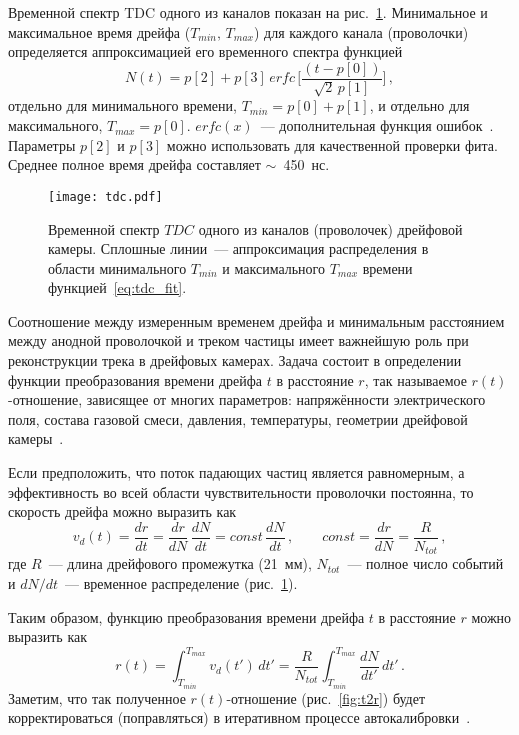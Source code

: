 Временной спектр TDC одного из каналов показан на рис.~\ref{fig:tdc}.
Минимальное и максимальное время дрейфа ($T_{min},\,T_{max}$) для каждого канала
(проволочки) определяется аппроксимацией его временного спектра функцией
\begin{equation}
  \label{eq:tdc_fit}
  N(t) = p[2] + p[3]\,erfc\,\Biggl[\frac{(t - p[0])}{\sqrt{2}\,p[1]} \Biggr]\,,
\end{equation}
отдельно для минимального времени, $T_{min} = p[0] + p[1]$, и отдельно для
максимального, $T_{max} = p[0]$. $erfc(x)$~--- дополнительная функция
ошибок~\cite{erfc_web}. Параметры $p[2]$ и $p[3]$ можно использовать для
качественной проверки фита. Среднее полное время дрейфа составляет
$\sim$~450~нс.

\begin{figure}[h]
  \centering
  \texttt{[image: tdc.pdf]}
  \caption{Временной спектр $TDC$ одного из каналов (проволочек) дрейфовой
    камеры. Сплошные линии~--- аппроксимация распределения в области
    минимального $T_{min}$ и максимального $T_{max}$ времени
    функцией~\eqref{eq:tdc_fit}.}
  \label{fig:tdc}
\end{figure}

Соотношение между измеренным временем дрейфа и минимальным расстоянием между
анодной проволочкой и треком частицы имеет важнейшую роль при реконструкции
трека в дрейфовых камерах. Задача состоит в определении функции преобразования
времени дрейфа $t$ в расстояние $r$, так называемое $r(t)$-отношение, зависящее
от многих параметров: напряжённости электрического поля, состава газовой смеси,
давления, температуры, геометрии дрейфовой камеры~\cite{pesehonov86}.

Если предположить, что поток падающих частиц является равномерным, а
эффективность во всей области чувствительности проволочки постоянна, то скорость
дрейфа можно выразить как
\begin{equation}
  v_{d}(t) = \frac{dr}{dt} = \frac{dr}{dN}\,\frac{dN}{dt} =
  const\,\frac{dN}{dt}\,, \qquad
  const = \frac{dr}{dN} = \frac{R}{N_{tot}}\,,
\end{equation}
где $R$~--- длина дрейфового промежутка (21~мм), $N_{tot}$~--- полное число
событий и $dN/dt$~--- временное распределение (рис.~\ref{fig:tdc}).

Таким образом, функцию преобразования времени дрейфа $t$ в расстояние $r$ можно
выразить как
\begin{equation}
  r(t) = \int_{T_{min}}^{T_{max}} v_{d}(t')\,dt' = \frac{R}{N_{tot}}
  \int_{T_{min}}^{T_{max}} \frac{dN}{dt'}\,dt'\,.
\end{equation}
Заметим, что так полученное $r(t)$-отношение (рис.~\ref{fig:t2r}) будет
корректироваться (поправляться) в итеративном процессе
автокалибровки~\cite{gla_mucha10}.

